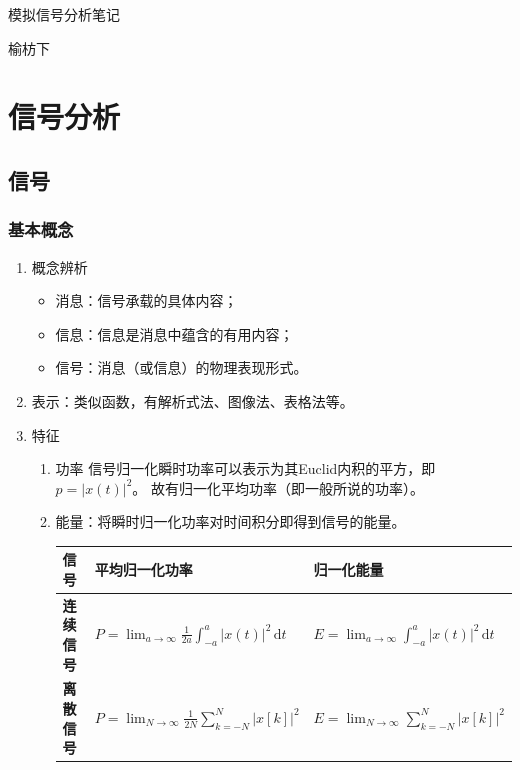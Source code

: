 \documentclass[UTF8,fontset=fandol,zihao=5]{ctexart}
\newcommand{\dd}{\,\mathrm{d}}
\begin{document}
\begin{center}
  {\heiti\headingfont{}\color{main} 模拟信号分析笔记}
\end{center}

\begin{center}
  {\kaishu{}\color{black} 榆枋下}
\end{center}

\section{信号分析}

\subsection{信号}

\subsubsection{基本概念}

\begin{enumerate}
  
  \item 概念辨析
  \begin{itemize}
    \item 消息：信号承载的具体内容；
    \item 信息：信息是消息中蕴含的有用内容；
    \item 信号：消息（或信息）的物理表现形式。
  \end{itemize}

  \item 表示：类似函数，有解析式法、图像法、表格法等。

  \item 特征
  \begin{enumerate}[label=(\arabic*)]

    \item 功率
信号归一化瞬时功率可以表示为其Euclid内积的平方，即$p = \left | x(t) \right |^2$。
故有归一化平均功率（即一般所说的功率）。
    \item 能量：将瞬时归一化功率对时间积分即得到信号的能量。

\begin{center}
\begin{tabularx}{0.98\textwidth}{>{\bfseries}p{1.5cm}X X}
\toprule
信号 & 平均归一化功率 & 归一化能量 \\
\midrule
连续信号 & $P =\displaystyle \lim_{a \to \infty} \frac{1}{2a} \displaystyle\int_{-a}^{a} \left | x \left (t \right ) \right |^2 \dd t$ & $E = \displaystyle \lim_{a \to \infty} \displaystyle \int_{-a}^{a} \left | x \left (t \right ) \right |^2 \dd t$ \\
离散信号 & $P =\displaystyle \lim_{N \to \infty} \frac{1}{2N} \displaystyle\sum_{k=-N}^{N} \left | x \left [ k \right ] \right |^2$ & $E = \displaystyle \lim_{N \to \infty} \displaystyle \sum_{k=-N}^{N} \left | x \left [ k \right ] \right |^2$ \\
\bottomrule
\end{tabularx}
\end{center}

  \end{enumerate}
\end{enumerate}
\end{document}
